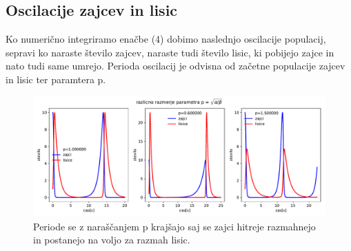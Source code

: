 \documentclass[11pt, a4paper]{article}
\begin{document}
\subsection{Oscilacije zajcev in lisic}
Ko numerično integriramo enačbe (4) dobimo naslednjo oscilacije populacij, sepravi ko naraste število zajcev, naraste tudi število lisic, ki pobijejo zajce in nato tudi same umrejo. Perioda oscilacij je odvisna od začetne populacije zajcev in lisic ter paramtera p.
\begin{figure}[htb!]
  \centering
  \includegraphics[width=18cm]{zajci_razlicna_razmerja.pdf}
  \caption{Periode se z naraščanjem p krajšajo saj se zajci hitreje razmahnejo in postanejo na voljo za razmah lisic.}
\end{figure}
\end{document}
